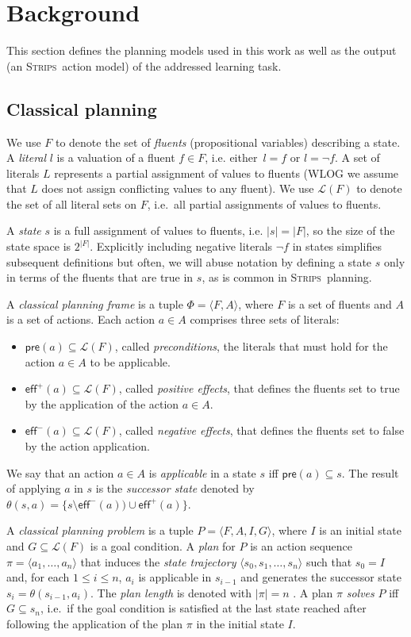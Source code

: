 \documentclass{article}
\newcommand{\tup}[1]{{\langle #1 \rangle}}
\newcommand{\pre}{\mathsf{pre}}     %
\newcommand{\eff}{\mathsf{eff}}     %
\newcommand{\strips}{\textsc{Strips}}     %
\begin{document}
\section{Background}
This section defines the planning models used in this work as well as the output (an \strips\ action model) of the addressed learning task.

\subsection{Classical planning}
We use $F$ to denote the set of {\em fluents} (propositional variables) describing a state. A {\em literal} $l$ is a valuation of a fluent $f\in F$, i.e. either~$l=f$ or $l=\neg f$. A set of literals $L$ represents a partial assignment of values to fluents (WLOG we assume that $L$ does not assign conflicting values to any fluent). We use $\mathcal{L}(F)$ to denote the set of all literal sets on $F$, i.e.~all partial assignments of values to fluents.

A {\em state} $s$ is a full assignment of values to fluents, i.e. $|s|=|F|$, so the size of the state space is $2^{|F|}$. Explicitly including negative literals $\neg f$ in states simplifies subsequent definitions but often, we will abuse notation by defining a state $s$ only in terms of the fluents that are true in $s$, as is common in \strips\ planning.

A {\em classical planning frame} is a tuple $\Phi=\tup{F,A}$, where $F$ is a set of fluents and $A$ is a set of actions. Each action $a\in A$ comprises three sets of literals:
\begin{itemize}
\item $\pre(a)\subseteq\mathcal{L}(F)$, called {\em preconditions}, the literals that must hold for the action $a\in A$ to be applicable.
\item $\eff^+(a)\subseteq\mathcal{L}(F)$, called {\em positive effects}, that defines the fluents set to true by the application of the action $a\in A$.
\item $\eff^-(a)\subseteq\mathcal{L}(F)$, called {\em negative effects}, that defines the fluents set to false by the action application.
\end{itemize}
We say that an action $a\in A$ is {\em applicable} in a state $s$ iff $\pre(a)\subseteq s$. The result of applying $a$ in $s$ is the {\em successor state} denoted by $\theta(s,a)=\{s\setminus\eff^-(a))\cup\eff^+(a)\}$.

A {\em classical planning problem} is a tuple $P=\tup{F,A,I,G}$, where $I$ is an initial state and $G\subseteq\mathcal{L}(F)$ is a goal condition. A {\em plan} for $P$ is an action sequence $\pi=\tup{a_1, \ldots, a_n}$ that induces the {\em state trajectory} $\tup{s_0, s_1, \ldots, s_n}$ such that $s_0=I$ and, for each {\small $1\leq i\leq n$}, $a_i$ is applicable in $s_{i-1}$ and generates the successor state $s_i=\theta(s_{i-1},a_i)$. The {\em plan length} is denoted with $|\pi|=n$ . A plan $\pi$ {\em solves} $P$ iff $G\subseteq s_n$, i.e.~if the goal condition is satisfied at the last state reached after following the application of the plan $\pi$ in the initial state $I$.
\end{document}
